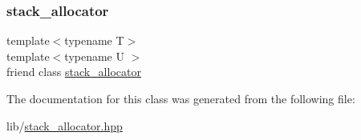 \mbox{\label{classterraces_1_1utils_1_1stack__allocator_a63e83703d59c04427b11c879b4f4a637}} 
\subsubsection{\texorpdfstring{stack\+\_\+allocator}{stack\_allocator}}
{\footnotesize\ttfamily template$<$typename T$>$ \\
template$<$typename U $>$ \\
friend class \hyperlink{classterraces_1_1utils_1_1stack__allocator}{stack\+\_\+allocator}\hspace{0.3cm}{\ttfamily [friend]}}



The documentation for this class was generated from the following file\+:\begin{DoxyCompactItemize}
\item 
lib/\hyperlink{stack__allocator_8hpp}{stack\+\_\+allocator.\+hpp}\end{DoxyCompactItemize}
